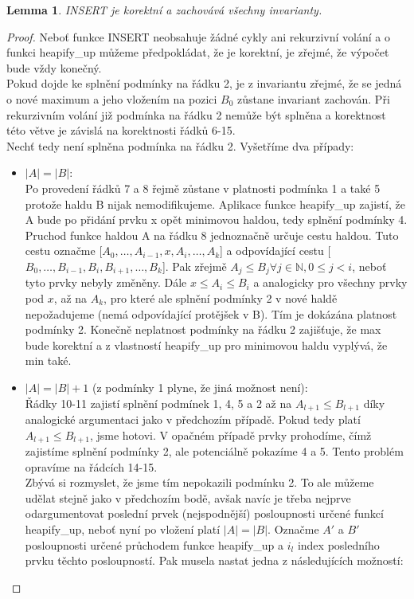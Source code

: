 \documentclass[12pt,a4paper]{article}
\theoremstyle{plain}
\newtheorem{lemma}[thm]{Lemma}
\newcommand{\N}{\mathbb{N}}
\begin{document}
\begin{lemma} INSERT je korektní a zachovává všechny invarianty.
\end{lemma}
\begin{proof}
Neboť funkce INSERT neobsahuje žádné cykly ani rekurzivní volání a o funkci heapify\_up můžeme předpokládat, že je korektní, je zřejmé, že výpočet bude vždy konečný.\\

Pokud dojde ke splnění podmínky na řádku 2, je z invariantu zřejmé, že se jedná o nové maximum a jeho vložením na pozici $ B_0 $ zůstane invariant zachován. Při rekurzivním volání již podmínka na řádku 2 nemůže být splněna a korektnost této větve je závislá na korektnosti řádků 6-15. \\

Nechť tedy není splněna podmínka na řádku 2. Vyšetříme dva případy:
\begin{itemize}
\item $|A| = |B| $:\\
Po provedení řádků 7 a 8 řejmě zůstane v platnosti podmínka 1 a také 5 protože haldu B nijak nemodifikujeme. Aplikace funkce heapify\_up zajistí, že A bude po přidání prvku x opět minimovou haldou, tedy splnění podmínky 4. Pruchod funkce haldou A na řádku 8 jednoznačně určuje cestu haldou. Tuto cestu označme [$A_0, \dots, A_{i-1}, x, A_i, \dots, A_k $] a odpovídající cestu [$B_0, \dots, B_{i-1}, B_i, B_{i + 1}, \dots, B_k $]. Pak zřejmě $ A_j \leq B_j \forall j \in \N, 0 \leq j < i $, neboť tyto prvky nebyly změněny. Dále $ x \leq A_i \leq B_i $ a analogicky pro všechny prvky pod $ x $, až na $ A_k $, pro které ale splnění podmínky 2 v nové haldě nepožadujeme (nemá odpovídající protějšek v B). Tím je dokázána platnost podmínky 2. Konečně neplatnost podmínky na řádku 2 zajišťuje, že max bude korektní a z vlastností heapify\_up pro minimovou haldu vyplývá, že min také.


\item $|A| = |B| + 1 $ (z podmínky 1 plyne, že jiná možnost není):\\
Řádky 10-11 zajistí splnění podmínek 1, 4, 5 a 2 až na $A_{l+1} \leq B_{l+1} $ díky analogické argumentaci jako v předchozím případě. Pokud tedy platí $A_{l+1} \leq B_{l+1} $, jsme hotovi. V opačném případě prvky prohodíme, čímž zajistíme splnění podmínky 2, ale potenciálně pokazíme 4 a 5. Tento problém opravíme na řádcích 14-15. \\

Zbývá si rozmyslet, že jsme tím nepokazili podmínku 2. To ale můžeme udělat stejně jako v předchozím bodě, avšak navíc je třeba nejprve odargumentovat poslední prvek (nejspodnější) posloupnosti určené funkcí heapify\_up, neboť nyní po vložení platí $ |A| = |B| $. Označme $A' $ a $B'$ posloupnosti určené průchodem funkce heapify\_up a $i_l $ index posledního prvku těchto posloupností. Pak musela nastat jedna z následujících možností:


\end{itemize}
\end{proof}
\end{document}
